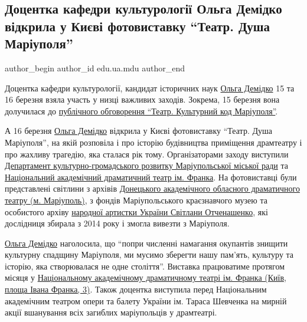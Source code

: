  
 
 
 
 
 
\subsection{Доцентка кафедри культурології Ольга Демідко відкрила у Києві фотовиставку \enquote{Театр. Душа Маріуполя}}
\label{sec:17_03_2023.stz.edu.ua.mdu.1.demidko_vystavka_kiev_dusha_teatr}
 
\ifcmt
 author_begin
   author_id edu.ua.mdu
 author_end
\fi

Доцентка кафедри культурології, кандидат історичних наук \href{https://archive.org/search?query=creator\%3A"Ольга+Демідко+(Маріуполь)"}{Ольга Демідко} 15 та 16
березня взяла участь у низці важливих заходів. Зокрема, 15 березня вона
долучилася до \href{https://archive.org/details/video.15_03_2023.ukrainskij_kryzovyj_media_centr}{публічного обговорення \enquote{Театр. Культурний код Маріуполя}}.

А 16 березня
\href{https://archive.org/search?query=creator\%3A"Ольга+Демідко+(Маріуполь)"}{Ольга
Демідко} відкрила у Києві фотовиставку \enquote{Театр. Душа Маріуполя}, на якій
розповіла і про історію будівництва приміщення драмтеатру і про жахливу
трагедію, яка сталася рік тому. Організаторами заходу виступили \href{\urlmkulturaIA}{Департамент
культурно-громадського розвитку Маріупольської міської ради} та \href{\urlKievDramTeatrFrankaIA}{Національний
академічний драматичний театр ім. Франка}. На фотовиставці були представлені
світлини з архівів \href{\urlMariupolDramTeatrIA}{Донецького академічного
обласного драматичного театру (м. Маріуполь)}, з фондів Маріупольського
краєзнавчого музею та особистого архіву
\href{\urlSvitlanaIvanivnaOtchenashenkoIA}{народної артистки України Світлани
Отченашенко}, які дослідниця збирала з 2014 року і змогла вивезти з Маріуполя.

\href{https://archive.org/search?query=creator\%3A"Ольга+Демідко+(Маріуполь)"}{Ольга
Демідко} наголосила, що \enquote{попри численні намагання окупантів знищити
культурну спадщину Маріуполя, ми мусимо зберегти нашу пам'ять, культуру та
історію, яка створювалася не одне століття}. Виставка працюватиме протягом
місяця у \href{\urlKievDramTeatrFrankaIA}{Національному академічному драматичному театрі ім. Франка (Київ, площа
Івана Франка, 3)}. Також доцентка виступила перед Національним академічним
театром опери та балету України ім. Тараса Шевченка на мирній акції вшанування
всіх загиблих маріупольців у драмтеатрі.


